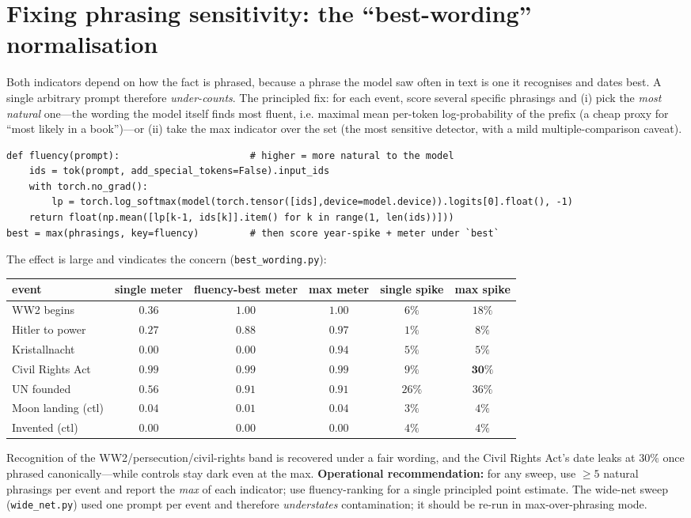 \documentclass[11pt]{article}
\newcommand{\code}[1]{\texttt{\small #1}}
\begin{document}
\section{Fixing phrasing sensitivity: the ``best-wording'' normalisation}\label{sec:wording}
Both indicators depend on how the fact is phrased, because a phrase the model saw often in text is one it recognises and
dates best. A single arbitrary prompt therefore \emph{under-counts}. The principled fix: for each event, score several
specific phrasings and (i) pick the \emph{most natural} one---the wording the model itself finds most fluent, i.e.
maximal mean per-token log-probability of the prefix (a cheap proxy for ``most likely in a book'')---or (ii) take the
max indicator over the set (the most sensitive detector, with a mild multiple-comparison caveat).
\begin{lstlisting}
def fluency(prompt):                       # higher = more natural to the model
    ids = tok(prompt, add_special_tokens=False).input_ids
    with torch.no_grad():
        lp = torch.log_softmax(model(torch.tensor([ids],device=model.device)).logits[0].float(), -1)
    return float(np.mean([lp[k-1, ids[k]].item() for k in range(1, len(ids))]))
best = max(phrasings, key=fluency)         # then score year-spike + meter under `best`
\end{lstlisting}
The effect is large and vindicates the concern (\code{best\_wording.py}):
\begin{center}\small
\begin{tabular}{lccccc}\toprule
event & single meter & fluency-best meter & \textbf{max meter} & single spike & \textbf{max spike}\\\midrule
WW2 begins       & $0.36$ & $1.00$ & $1.00$ & $6\%$ & $18\%$\\
Hitler to power  & $0.27$ & $0.88$ & $0.97$ & $1\%$ & $8\%$\\
Kristallnacht    & $0.00$ & $0.00$ & $0.94$ & $5\%$ & $5\%$\\
Civil Rights Act & $0.99$ & $0.99$ & $0.99$ & $9\%$ & $\mathbf{30\%}$\\
UN founded       & $0.56$ & $0.91$ & $0.91$ & $26\%$ & $36\%$\\
\midrule
Moon landing (ctl) & $0.04$ & $0.01$ & $0.04$ & $3\%$ & $4\%$\\
Invented (ctl)     & $0.00$ & $0.00$ & $0.00$ & $4\%$ & $4\%$\\\bottomrule
\end{tabular}
\end{center}
Recognition of the WW2/persecution/civil-rights band is recovered under a fair wording, and the Civil Rights Act's date
leaks at $30\%$ once phrased canonically---while controls stay dark even at the max. \textbf{Operational recommendation:}
for any sweep, use $\ge 5$ natural phrasings per event and report the \emph{max} of each indicator; use fluency-ranking
for a single principled point estimate. The wide-net sweep (\code{wide\_net.py}) used one prompt per event and therefore
\emph{understates} contamination; it should be re-run in max-over-phrasing mode.
\end{document}
